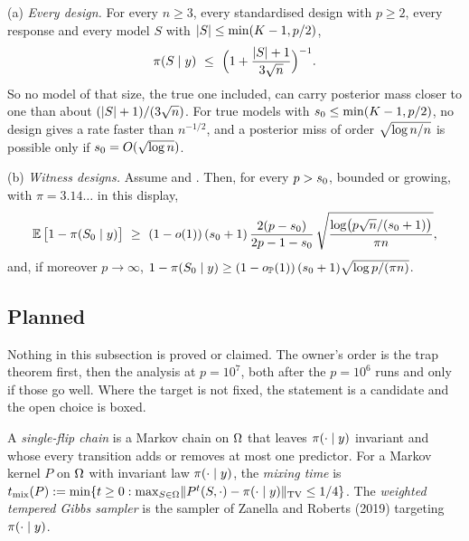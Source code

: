 
\begin{mainthm}\label{rem:sharp}
\textup{(a)} \emph{Every design.} For every $n\ge3$, every standardised design with $p\ge2$, every response and every
model $S$ with $\lvert S\rvert\le\min(K-1,p/2)$,
\begin{equation}\label{eq:sharp-a}
  \pi(S\mid y)\ \le\ \Big(1+\frac{\lvert S\rvert+1}{3\sqrt n}\Big)^{-1}.
\end{equation}
So no model of that size, the true one included, can carry posterior mass closer to one than about
$(\lvert S\rvert+1)/(3\sqrt n)$. For true models with $s_0\le\min(K-1,p/2)$, no design gives a rate faster than
$n^{-1/2}$, and a posterior miss of order $\sqrt{\log n/n}$ is possible only if $s_0=O(\sqrt{\log n})$.

\textup{(b)} \emph{Witness designs.} Assume  and . Then, for every $p>s_0$, bounded or growing, with
$\pi=3.14\ldots$ in this display,
\begin{equation}\label{eq:sharp-b}
  \E\big[1-\pis{\Sz}\big]\ \ge\ (1-o(1))\,(\sz+1)\,\frac{2(p-\sz)}{2p-1-\sz}\,
  \sqrt{\frac{\log\!\big(p\sqrt n/(\sz+1)\big)}{\pi n}},
\end{equation}
and, if moreover $p\to\infty$, $1-\pi(S_0\mid y)\ge(1-o_{\mathbb{P}}(1))\,(s_0+1)\sqrt{\log p/(\pi n)}$.
\end{mainthm}


\subsection{Planned}\label{sec:planned}

Nothing in this subsection is proved or claimed. The owner's order is the trap theorem first, then the analysis at
$p=10^7$, both after the $p=10^6$ runs and only if those go well. Where the target is not fixed, the statement is a
candidate and the open choice is boxed.

\begin{definition}\label{def:singleflip}
A \emph{single-flip chain} is a Markov chain on $\Omega$ that leaves $\pi(\cdot\mid y)$ invariant and whose every transition
adds or removes at most one predictor. For a Markov kernel $P$ on $\Omega$ with invariant law $\pi(\cdot\mid y)$, the
\emph{mixing time} is $t_{\mathrm{mix}}(P):=\min\{t\ge0:\max_{S\in\Omega}\lVert P^t(S,\cdot)-\pi(\cdot\mid y)\rVert_{\mathrm{TV}}\le1/4\}$.
The \emph{weighted tempered Gibbs sampler} is the sampler of Zanella and Roberts (2019) targeting $\pi(\cdot\mid y)$.
\end{definition}

